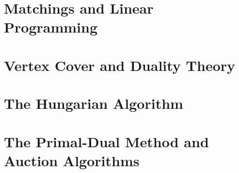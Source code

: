 \documentclass[11pt,twoside]{reedthesis}
\renewcommand{\'}{^{'}}
\theoremstyle{plain}
\theoremstyle{definition}
\begin{document}
	
	
\chapter{Matchings and Linear Programming}



\chapter{Vertex Cover and Duality Theory}



\chapter{The Hungarian Algorithm}



\chapter{The Primal-Dual Method and Auction Algorithms}


	

\backmatter %

\nocite{*}


\end{document}

